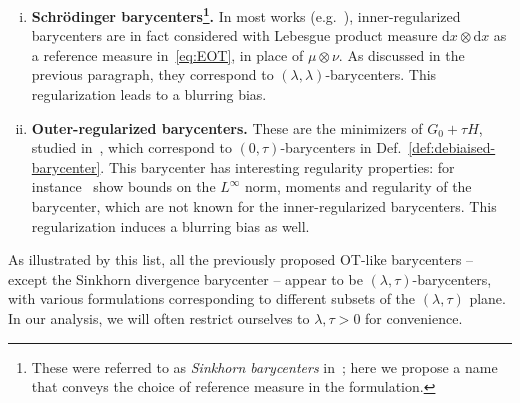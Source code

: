\documentclass[11pt]{article}
\newcommand{\RR}{\mathbb{R}}
\renewcommand{\d}{\mathrm{d}}
\begin{document}
\begin{enumerate}[(i)]
 $$
\mu \mapsto \sum_{k=1}^K w_k S_\lambda(\mu,\nu_k) = G_\lambda(\mu) - \tfrac12 T_{\lambda}(\mu,\mu) + C
 $$
 where $C\in \RR$ does not depend on $\mu$. We will use the notation $\mu_{\lambda,\mathrm{div}}^*$ for this barycenter.
 The self-EOT term indeed reduces the bias of the barycenter: this is shown for Gaussian distributions in~\cite{janati2020debiased}, and for general smooth measures in Section~\ref{sec:approximation}. However, little else is known about this barycenter regarding uniqueness, stability or regularity. This formulation is not covered by Def.~\ref{def:debiaised-barycenter}.
\item \textbf{Schr\"odinger barycenters\footnote{These were referred to as \emph{Sinkhorn barycenters} in~\cite{bigot2019penalization}; here we propose a name that conveys the choice of reference measure in the formulation.
}.} In most works (e.g.~\cite{cuturi2014fast,cuturi2018semidual,bigot2019penalization}), inner-regularized barycenters are in fact considered with Lebesgue product measure $\d x\otimes \d x$ as a reference measure in~\eqref{eq:EOT}, in place of $\mu\otimes \nu$. As discussed in the previous paragraph, they correspond to $(\lambda,\lambda)$-barycenters. This regularization leads to a blurring bias.
\item  \textbf{Outer-regularized barycenters.} These are the minimizers of  $G_0+\tau H$, studied in~\cite{bigot2019data, carlier2021entropic}, which correspond to $(0,\tau)$-barycenters in Def.~\ref{def:debiaised-barycenter}. This barycenter has interesting regularity properties: for instance~\cite{carlier2021entropic} show bounds on the $L^\infty$ norm, moments and regularity of the barycenter, which are not known for the inner-regularized barycenters. This regularization induces a blurring bias as well.
\end{enumerate}
As illustrated by this list, all the previously proposed OT-like barycenters -- except the Sinkhorn divergence barycenter -- appear to be $(\lambda,\tau)$-barycenters, with various formulations corresponding to different subsets of the $(\lambda,\tau)$ plane. In our analysis, we will often restrict ourselves to $\lambda,\tau>0$ for convenience.
\end{document}
